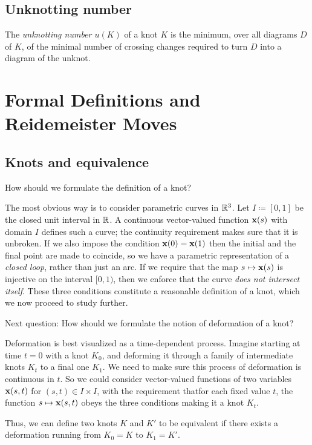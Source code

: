 \subsection{Unknotting number}
\begin{definition}
  The \emph{unknotting number $u(K)$} of a knot $K$ is the minimum, over
  all diagrams $D$ of $K$, of the minimal number of crossing changes
  required to turn $D$ into a diagram of the unknot.
\end{definition}

\section{Formal Definitions and Reidemeister Moves}
\subsection{Knots and equivalence}
How should we formulate the definition of a knot?

The most obvious way is to consider parametric curves in $\mathbb{R}^3$. Let
$I\coloneq [0,1]$ be the closed unit interval in $\mathbb{R}$. A continuous
vector-valued function $\mathbf{x}(s)$ with domain $I$ defines such a curve; the
continuity requirement makes sure that it is unbroken. If we also impose
the condition $\mathbf{x}(0)=\mathbf{x}(1)$ then the initial and the final point are
made to coincide, so we have a parametric representation of a \emph{closed
  loop}, rather than just an arc. If we require that the map
$s\mapsto\mathbf{x}(s)$ is injective on the interval $[0,1)$, then we enforce
that the curve \emph{does not intersect itself}. These three conditions
constitute a reasonable definition of a knot, which we now proceed to study
further.

Next question: How should we formulate the notion of deformation of a knot?

Deformation is best visualized as a time-dependent process. Imagine
starting at time $t=0$ with a knot $K_0$, and deforming it through a family
of intermediate knots $K_t$ to a final one $K_1$. We need to make sure this
process of deformation is continuous in $t$. So we could consider
vector-valued functions of two variables $\mathbf{x}(s,t)$ for $(s,t)\in I\times
I$, with the requirement thatfor each fixed value $t$, the function
$s\mapsto\mathbf{x}(s,t)$ obeys the three conditions making it a knot $K_t$.

Thus, we can define two knots $K$ and $K'$ to be equivalent if there exists
a deformation running from $K_0=K$ to $K_1=K'$.

